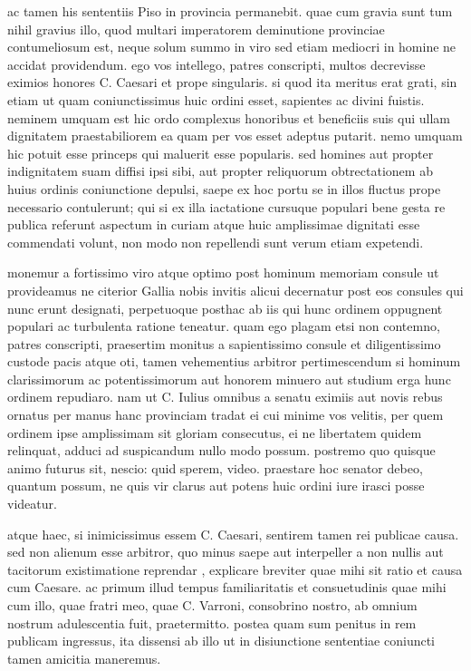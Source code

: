  ac tamen his sententiis Piso in provincia permanebit. quae cum gravia sunt tum nihil gravius illo, quod multari imperatorem deminutione provinciae contumeliosum est, neque solum summo in viro sed etiam mediocri in homine ne accidat providendum. ego vos intellego, patres conscripti, multos decrevisse eximios honores C. Caesari et prope singularis. si quod ita meritus erat grati, sin etiam ut quam coniunctissimus huic ordini esset, sapientes ac divini fuistis. neminem umquam est hic ordo complexus honoribus et beneficiis suis qui ullam dignitatem praestabiliorem ea quam per vos esset adeptus putarit. nemo umquam hic potuit esse princeps qui maluerit esse popularis. sed homines aut propter indignitatem suam diffisi ipsi sibi, aut propter reliquorum obtrectationem ab huius ordinis coniunctione depulsi, saepe ex hoc portu se in illos fluctus prope necessario contulerunt; qui si ex illa iactatione cursuque populari bene gesta re publica referunt aspectum in curiam atque huic amplissimae dignitati esse commendati volunt, non modo non repellendi sunt verum etiam expetendi.

 monemur a fortissimo viro atque optimo post hominum memoriam consule ut provideamus ne citerior Gallia nobis invitis alicui decernatur post eos consules qui nunc erunt designati, perpetuoque posthac ab iis qui hunc ordinem oppugnent populari ac turbulenta ratione teneatur. quam ego plagam etsi non contemno, patres conscripti, praesertim monitus a sapientissimo consule et diligentissimo custode pacis atque oti, tamen vehementius arbitror pertimescendum si hominum clarissimorum ac potentissimorum aut honorem minuero aut studium erga hunc ordinem repudiaro. nam ut C. Iulius omnibus a senatu eximiis aut novis rebus ornatus per manus hanc provinciam tradat ei cui minime vos velitis, per quem ordinem ipse amplissimam sit gloriam consecutus, ei ne libertatem quidem relinquat, adduci ad suspicandum nullo modo possum. postremo quo quisque animo futurus sit, nescio: quid sperem, video. praestare hoc senator debeo, quantum possum, ne quis vir clarus aut potens huic ordini iure irasci posse videatur.

 atque haec, si inimicissimus essem C. Caesari, sentirem tamen rei publicae causa. sed non alienum esse arbitror, quo minus saepe aut interpeller a non nullis aut tacitorum existimatione reprendar , explicare breviter quae mihi sit ratio et causa cum Caesare. ac primum illud tempus familiaritatis et consuetudinis quae mihi cum illo, quae fratri meo, quae C. Varroni, consobrino nostro, ab omnium nostrum adulescentia fuit, praetermitto. postea quam sum penitus in rem publicam ingressus, ita dissensi ab illo ut in disiunctione sententiae coniuncti tamen amicitia maneremus.

